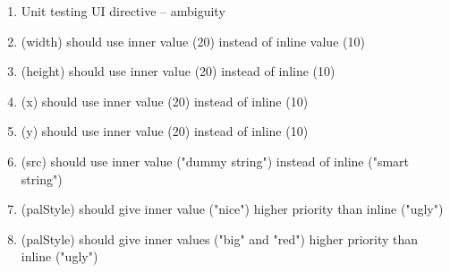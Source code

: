 \begin{singlespace}
\begin{enumerate}
\item Unit testing UI directive -- ambiguity
\item     (width) should use inner value (20) instead of inline value (10)
\item     (height) should use inner value (20) instead of inline (10)
\item     (x) should use inner value (20) instead of inline (10)
\item     (y) should use inner value (20) instead of inline (10)
\item     (src) should use inner value ("dummy string") instead of inline ("smart string")
\item     (palStyle) should give inner value ("nice") higher priority than inline ("ugly")
\item     (palStyle) should give inner values ("big" and "red") higher priority than inline ("ugly")
\end{enumerate}


\end{singlespace}
